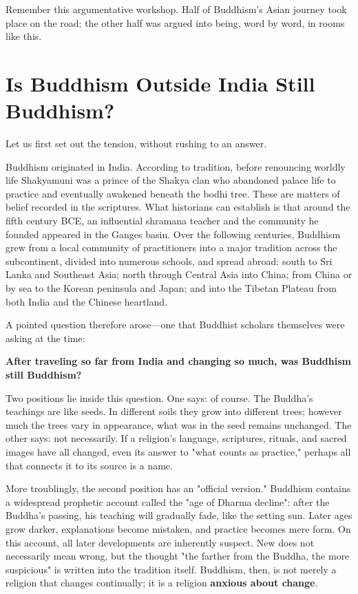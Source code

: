 Remember this argumentative workshop. Half of Buddhism's Asian journey took place on the road; the other half was argued into being, word by word, in rooms like this.

\section{Is Buddhism Outside India Still Buddhism?}
Let us first set out the tension, without rushing to an answer.

Buddhism originated in India. According to tradition, before renouncing worldly life Shakyamuni was a prince of the Shakya clan who abandoned palace life to practice and eventually awakened beneath the bodhi tree. These are matters of belief recorded in the scriptures. What historians can establish is that around the fifth century BCE, an influential shramana teacher and the community he founded appeared in the Ganges basin. Over the following centuries, Buddhism grew from a local community of practitioners into a major tradition across the subcontinent, divided into numerous schools, and spread abroad: south to Sri Lanka and Southeast Asia; north through Central Asia into China; from China or by sea to the Korean peninsula and Japan; and into the Tibetan Plateau from both India and the Chinese heartland.

A pointed question therefore arose---one that Buddhist scholars themselves were asking at the time:

\textbf{After traveling so far from India and changing so much, was Buddhism still Buddhism?}

Two positions lie inside this question. One says: of course. The Buddha's teachings are like seeds. In different soils they grow into different trees; however much the trees vary in appearance, what was in the seed remains unchanged. The other says: not necessarily. If a religion's language, scriptures, rituals, and sacred images have all changed, even its answer to "what counts as practice," perhaps all that connects it to its source is a name.

More troublingly, the second position has an "official version." Buddhism contains a widespread prophetic account called the "age of Dharma decline": after the Buddha's passing, his teaching will gradually fade, like the setting sun. Later ages grow darker, explanations become mistaken, and practice becomes mere form. On this account, all later developments are inherently suspect. New does not necessarily mean wrong, but the thought "the farther from the Buddha, the more suspicious" is written into the tradition itself. Buddhism, then, is not merely a religion that changes continually; it is a religion \textbf{anxious about change}.


